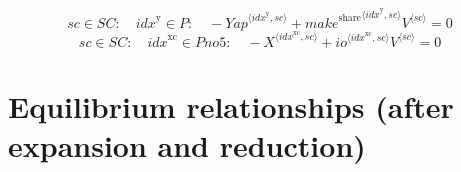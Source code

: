 \begin{equation}
{s\!c}\in {S\!C}\colon\quad {i\!d\!x}^{\mathrm{y}}\in P\colon\quad -{{Y\!a\!p}}^{\langle {i\!d\!x}^{\mathrm{y}},{s\!c}\rangle} + {{{m\!a\!k\!e}^{\mathrm{share}}}^{\langle {i\!d\!x}^{\mathrm{y}},{s\!c}\rangle}} {{V}^{\langle {s\!c}\rangle}} = 0
\end{equation}
\begin{equation}
{s\!c}\in {S\!C}\colon\quad {i\!d\!x}^{\mathrm{xc}}\in {P\!n\!o\!5}\colon\quad -{X}^{\langle {i\!d\!x}^{\mathrm{xc}},{s\!c}\rangle} + {{{i\!o}}^{\langle {i\!d\!x}^{\mathrm{xc}},{s\!c}\rangle}} {{V}^{\langle {s\!c}\rangle}} = 0
\end{equation}



\section{Equilibrium relationships (after expansion and reduction)}

